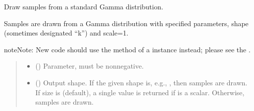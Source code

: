 \documentclass[letterpaper,10pt,english]{sphinxmanual}
\begin{document}
\begin{fulllineitems}
\label{\detokenize{metilda.controllers:metilda.controllers.pitch_art_wizard.standard_gamma}}
\pysigstartsignatures
{}
\pysigstopsignatures
\sphinxAtStartPar
Draw samples from a standard Gamma distribution.

\sphinxAtStartPar
Samples are drawn from a Gamma distribution with specified parameters,
shape (sometimes designated “k”) and scale=1.

\begin{sphinxadmonition}{note}{Note:}
\sphinxAtStartPar
New code should use the
method of a  instance instead;
please see the .
\end{sphinxadmonition}
\begin{quote}\begin{description}
\begin{itemize}
\item {} 
\sphinxAtStartPar
{} () \textendash{} Parameter, must be non\sphinxhyphen{}negative.

\item {} 
\sphinxAtStartPar
{} (\sphinxstyleliteralemphasis{\sphinxupquote{, }}) \textendash{} Output shape.  If the given shape is, e.g., , then
 samples are drawn.  If size is  (default),
a single value is returned if  is a scalar.  Otherwise,
 samples are drawn.


\end{itemize}
\end{description}
\end{quote}
\end{fulllineitems}
\end{document}
